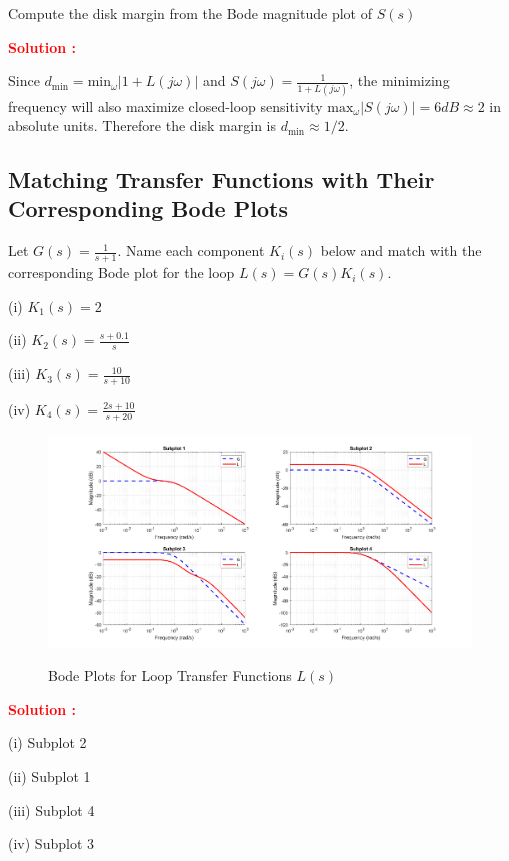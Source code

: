 \documentclass[12pt]{article}
\begin{document}
Compute the disk margin from the Bode magnitude plot of $S(s)$ 

\textbf{\textcolor{red}{Solution :}}

Since $d_{\text{min}} = \text{min}_{\omega} | 1 + L(j \omega) | $ and $S(j \omega) = \frac{1}{1 + L(j\omega)}$, the minimizing frequency will also maximize closed-loop sensitivity $\text{max}_\omega |S(j\omega)| = 6 dB \approx 2$ in absolute units. Therefore the disk margin is $d_{\text{min}} \approx  1/2$.
\clearpage

\subsection{Matching Transfer Functions with Their Corresponding Bode Plots}

Let \(G(s) = \frac{1}{s+1}\). Name each component \(K_i(s)\) below and match with the corresponding Bode plot for the loop \(L(s) = G(s) K_i(s)\).

\begin{enumerate*}
    \item[(i)] \(K_1(s) = 2\)
    \item[(ii)] \(K_2(s) = \frac{s+0.1}{s}\)
    \item[(iii)] \(K_3(s) = \frac{10}{s+10}\)
    \item[(iv)] \(K_4(s) = \frac{2s+10}{s+20}\)
\end{enumerate*}


\begin{figure}[H]
        \centering
        \includegraphics[width=\textwidth]{figs/6.7.png}
        \label{fig:nyquist_92}
        \caption{Bode Plots for Loop Transfer Functions \(L(s)\)}
\end{figure}
\textbf{\textcolor{red}{Solution :}}

\begin{enumerate*}
    \item[(i)] Subplot 2
    \item[(ii)] Subplot 1
    \item[(iii)] Subplot 4
    \item[(iv)] Subplot 3
\end{enumerate*}\\
\clearpage
\end{document}
